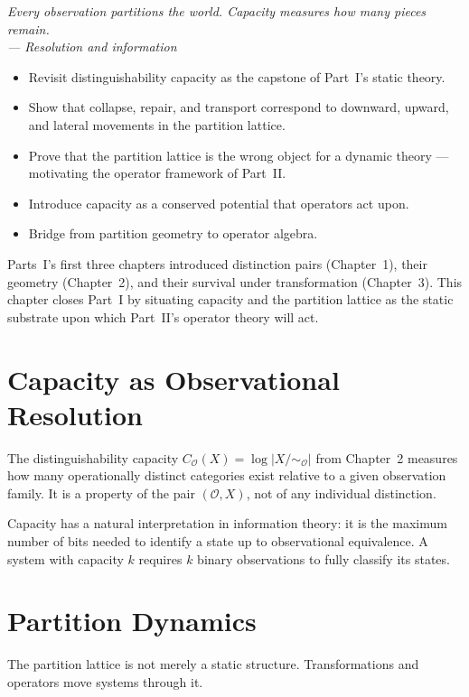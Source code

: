 \documentclass[12pt,twoside,openright]{book}
\newcommand{\obs}{\mathcal{O}}
\newenvironment{epigraph}[2]{%
  \vspace{1em}\begin{flushright}
  \begin{minipage}{0.72\textwidth}
  \itshape\small #1\\[0.4em]
  \upshape\footnotesize\sffamily\color{DistGray}--- #2
  \end{minipage}\end{flushright}\vspace{1.5em}}{}
\newenvironment{objectives}{%
  \begin{tcolorbox}[colback=DistBlue!5,colframe=DistBlue,
    title={\faCheckCircle\enspace Chapter Objectives},
    fonttitle=\sffamily\bfseries\color{white},
    attach boxed title to top left={yshift=-2mm,xshift=4mm},
    boxed title style={colback=DistBlue},breakable]
  \begin{itemize}[leftmargin=*,nosep]}{%
  \end{itemize}\end{tcolorbox}\vspace{1em}}
\providecommand{\quotientObs}{X/{\sim_{\obs}}}
\providecommand{\capObs}[1]{C_{\obs}(#1)}
\begin{document}
\begin{epigraph}{Every observation partitions the world.
  Capacity measures how many pieces remain.}{Resolution and
  information}
\end{epigraph}

\begin{objectives}
\item Revisit distinguishability capacity as the capstone of
  Part~I's static theory.
\item Show that collapse, repair, and transport correspond to
  downward, upward, and lateral movements in the partition
  lattice.
\item Prove that the partition lattice is the wrong object for
  a dynamic theory --- motivating the operator framework of
  Part~II.
\item Introduce capacity as a conserved potential that
  operators act upon.
\item Bridge from partition geometry to operator algebra.
\end{objectives}

Parts~I's first three chapters introduced distinction pairs
(Chapter~1), their geometry (Chapter~2), and their survival
under transformation (Chapter~3). This chapter closes Part~I
by situating capacity and the partition lattice as the static
substrate upon which Part~II's operator theory will act.

\section{Capacity as Observational Resolution}

The distinguishability capacity $\capObs{X}=\log|\quotientObs|$
from Chapter~2 measures how many operationally distinct
categories exist relative to a given observation family. It is
a property of the pair $(\obs, X)$, not of any individual
distinction.

Capacity has a natural interpretation in information theory:
it is the maximum number of bits needed to identify a state
up to observational equivalence. A system with capacity $k$
requires $k$ binary observations to fully classify its states.

\section{Partition Dynamics}

The partition lattice is not merely a static structure.
Transformations and operators move systems through it.
\end{document}
